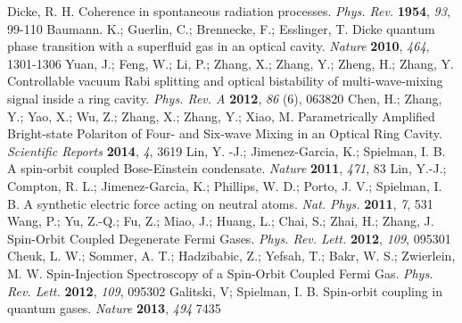 \documentclass[atoms,article,submit,moreauthors,dvi2pdf,12pt,a4paper]{mdpi}
\begin{document}
\begin{thebibliography}{999}

Dicke, R. H. Coherence in spontaneous radiation processes. {\em Phys. Rev.} {\bf 1954}, {\em 93}, 99-110
Baumann. K.; Guerlin, C.; Brennecke, F.; Esslinger, T. Dicke quantum phase transition with a superfluid gas in an optical cavity. {\em Nature} {\bf 2010}, {\em 464}, 1301-1306
 Yuan, J.; Feng, W.; Li, P.; Zhang, X.; Zhang, Y.; Zheng, H.; Zhang, Y. Controllable vacuum Rabi splitting and optical bistability of multi-wave-mixing signal inside a ring cavity. {\em Phys. Rev. A} {\bf 2012}, {\em 86} (6), 063820
 Chen, H.; Zhang, Y.; Yao, X.; Wu, Z.; Zhang, X.; Zhang, Y.; Xiao, M. Parametrically Amplified Bright-state Polariton of Four- and Six-wave Mixing in an Optical Ring Cavity. {\em Scientific Reports} {\bf 2014}, {\em 4}, 3619
Lin, Y. -J.; Jimenez-Garcia, K.; Spielman, I. B. A spin-orbit coupled Bose-Einstein condensate. {\em Nature} {\bf 2011}, {\em 471}, 83
Lin, Y.-J.; Compton, R. L.; Jimenez-Garcia, K.; Phillips, W. D.; Porto, J. V.; Spielman, I. B. A synthetic electric force acting on neutral atoms. {\em Nat. Phys.} {\bf 2011}, {\em 7}, 531
Wang, P.; Yu, Z.-Q.; Fu, Z.; Miao, J.; Huang, L.; Chai, S.; Zhai, H.; Zhang, J. Spin-Orbit Coupled Degenerate Fermi Gases. {\em Phys. Rev. Lett.} {\bf 2012}, {\em 109}, 095301
Cheuk, L. W.; Sommer, A. T.; Hadzibabic, Z.; Yefsah, T.; Bakr, W. S.; Zwierlein, M. W. Spin-Injection Spectroscopy of a Spin-Orbit Coupled Fermi Gas. {\em Phys. Rev. Lett.} {\bf 2012}, {\em 109}, 095302
Galitski, V; Spielman, I. B. Spin-orbit coupling in quantum gases. {\em Nature} {\bf 2013}, {\em 494} 7435

\end{thebibliography}
\end{document}
